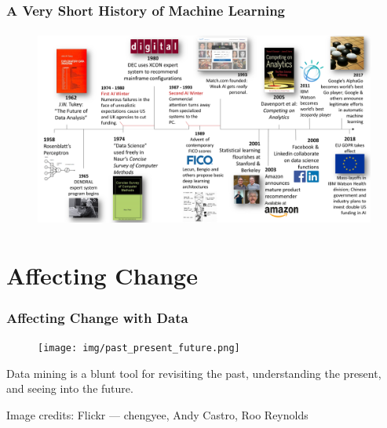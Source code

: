 \documentclass[11pt,
               aspectratio=169
               ]{beamer}
\begin{document}
		\begin{frame}
	
			\frametitle{A Very Short History of Machine Learning}
	
				\begin{figure}[htb]
					\begin{center}
						\includegraphics[height=185pt]{img/timeline.png}
						\label{fig:timeline}
					\end{center}
				\end{figure}
	
		\end{frame}	
	
	\section{Affecting Change}
	
		\begin{frame}[t]
		
			\frametitle{Affecting Change with Data}
		
			\vspace{-10pt}
		
			\begin{figure}[htb]
				\begin{center}
					\texttt{[image: img/past\_present\_future.png]}
					\label{fig:pat_present_future}

				\end{center}
			\end{figure}
		
			\vspace{-20pt}
		
			Data mining is a blunt tool for revisiting the past, understanding the present, and seeing into the future.
			
			\vspace{10pt}
			
			\tiny Image credits: Flickr --- chengyee, Andy Castro, Roo Reynolds
			
		
		\end{frame}
	
\end{document}
